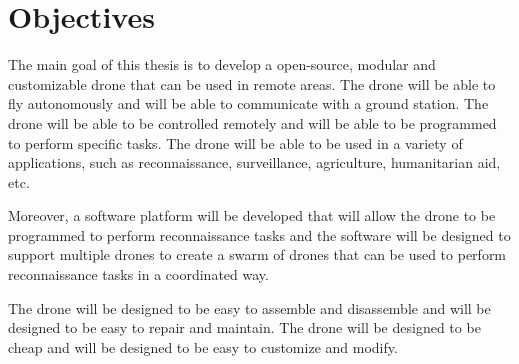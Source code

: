 \chapter{Objectives}
\label{ch:objectives}

The main goal of this thesis is to develop a open-source, modular and customizable drone that can be used in remote areas. The drone will be able to fly autonomously and will be able to communicate with a ground station. The drone will be able to be controlled remotely and will be able to be programmed to perform specific tasks. The drone will be able to be used in a variety of applications, such as reconnaissance, surveillance, agriculture, humanitarian aid, etc.

Moreover, a software platform will be developed that will allow the drone to be programmed to perform reconnaissance tasks and the software will be designed to support multiple drones to create a swarm of drones that can be used to perform reconnaissance tasks in a coordinated way.

The drone will be designed to be easy to assemble and disassemble and will be designed to be easy to repair and maintain. The drone will be designed to be cheap and will be designed to be easy to customize and modify.
